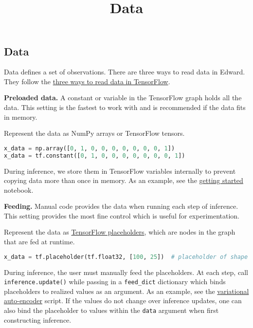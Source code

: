 \title{Data}

\subsection{Data}

Data defines a set of observations. There are three ways
to read data in Edward. They follow the
\href{https://www.tensorflow.org/programmers_guide/reading_data}
{three ways to read data in TensorFlow}.

\textbf{Preloaded data.}
A constant or variable in the TensorFlow graph holds all the data.
This setting is the fastest to work with and is recommended if the
data fits in memory.

Represent the data as NumPy arrays or TensorFlow tensors.

\begin{lstlisting}[language=Python]
x_data = np.array([0, 1, 0, 0, 0, 0, 0, 0, 0, 1])
x_data = tf.constant([0, 1, 0, 0, 0, 0, 0, 0, 0, 1])
\end{lstlisting}

During inference, we store them in TensorFlow variables internally to
prevent copying data more than once in memory. As an example, see the
\href{http://nbviewer.jupyter.org/github/blei-lab/edward/blob/master/notebooks/getting_started.ipynb}{getting started} notebook.

\textbf{Feeding.}
Manual code provides the data when running each step of inference.
This setting provides the most fine control which is useful for
experimentation.

Represent the data as
\href{https://www.tensorflow.org/programmers_guide/reading_data#feeding}{TensorFlow placeholders},
which are nodes in the graph that are fed at runtime.

\begin{lstlisting}[language=Python]
x_data = tf.placeholder(tf.float32, [100, 25])  # placeholder of shape (100, 25)
\end{lstlisting}

During inference, the user must manually feed the placeholders. At each
step, call \texttt{inference.update()} while
passing in a \texttt{feed_dict} dictionary
which binds placeholders to realized values as an argument. As an example, see the
\href{https://github.com/blei-lab/edward/blob/master/examples/vae.py}
{variational auto-encoder} script.
If the values do not change over inference updates, one can also bind
the placeholder to values within the \texttt{data} argument when
first constructing inference.


